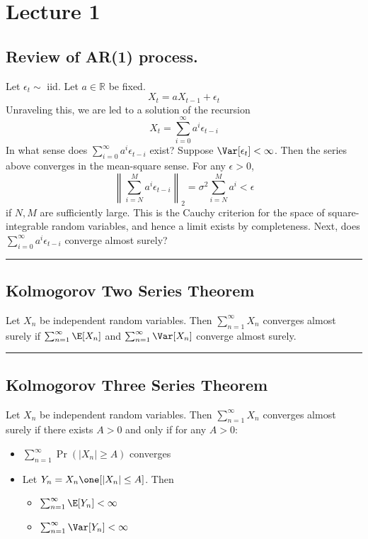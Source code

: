 \section{Lecture 1}

\subsection*{Review of AR(1) process.}
Let \(\epsilon_t \sim\) iid. Let \(a \in \mathbb{R}\) be fixed.
\[X_t = a X_{t-1} + \epsilon_t\]
Unraveling this, we are led to a solution of the recursion
\[X_t = \sum_{i=0}^\infty a^i \epsilon_{t-i}\]
In what sense does \(\sum_{i=0}^\infty a^i \epsilon_{t-i}\) exist? Suppose \(\Var[\epsilon_t] < \infty\). Then the series above converges in the mean-square sense. For any \(\epsilon > 0\),
\[\left\|\sum_{i=N}^M a^i \epsilon_{t-i} \right\|_2 = \sigma^2 \sum_{i=N}^M a^i < \epsilon\]
if \(N, M\) are sufficiently large. This is the Cauchy criterion for the space of square-integrable random variables, and hence a limit exists by completeness. Next, does \(\sum_{i=0}^\infty a^i \epsilon_{t-i}\) converge almost surely?

\begin{center}\rule{0.5\linewidth}{0.5pt}\end{center}

\subsection*{Kolmogorov Two Series Theorem}
Let \(X_n\) be independent random variables. Then \(\sum_{n=1}^\infty X_n\) converges almost surely if \(\sum_{n=1}^\infty \E[X_n]\) and \(\sum_{n=1}^\infty \Var[X_n]\) converge almost surely.

\begin{center}\rule{0.5\linewidth}{0.5pt}\end{center}

\subsection*{Kolmogorov Three Series Theorem}
Let \(X_n\) be independent random variables. Then \(\sum_{n=1}^\infty X_n\) converges almost surely if there exists \(A > 0\) and only if for any \(A > 0\):

\begin{itemize}
\tightlist
\item
  \(\sum_{n=1}^\infty \Pr(|X_n| \geq A)\) converges
\item
  Let \(Y_n = X_n \one[|X_n| \leq A]\). Then

  \begin{itemize}
  \tightlist
  \item
    \(\sum_{n=1}^\infty \E[Y_n] < \infty\)
  \item
    \(\sum_{n=1}^\infty \Var[Y_n] < \infty\)
  \end{itemize}
\end{itemize}

